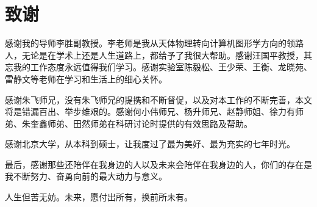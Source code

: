 \chapter{致谢}
感谢我的导师李胜副教授。李老师是我从天体物理转向计算机图形学方向的领路人，无论是在学术上还是人生道路上，都给予了我很大帮助。感谢汪国平教授，其忘我的工作态度永远值得我们学习。感谢实验室陈毅松、王少荣、王衡、龙晓苑、雷静文等老师在学习和生活上的细心关怀。

感谢朱飞师兄，没有朱飞师兄的提携和不断督促，以及对本工作的不断完善，本文将是错漏百出、举步维艰的。感谢何小伟师兄、杨升师兄、赵静师姐、徐力有师弟、朱奎鑫师弟、田然师弟在科研讨论时提供的有效思路及帮助。

感谢北京大学，从本科到硕士，让我度过了最为美好、最为充实的七年时光。

最后，感谢那些还陪伴在我身边的人以及未来会陪伴在我身边的人，你们的存在是我不断努力、奋勇向前的最大动力与意义。

人生但苦无妨。未来，愿付出所有，换前所未有。
